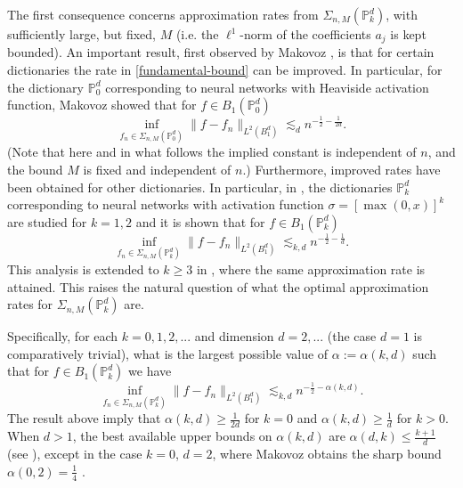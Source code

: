 The first consequence concerns approximation rates from $\Sigma_{n,M}(\mathbb{P}^d_k)$, with sufficiently large, but fixed, $M$ (i.e. the $\ell^1$-norm of the coefficients $a_j$ is kept bounded). An important result, first observed by Makovoz \cite{makovoz1996random}, is that for certain dictionaries the rate in \eqref{fundamental-bound} can be improved. In particular, for the dictionary $\mathbb{P}^d_0$ corresponding to neural networks with Heaviside activation function, Makovoz showed that for $f\in B_1(\mathbb{P}^d_0)$
\begin{equation}\label{makovoz-original}
 \inf_{f_n\in \Sigma_{n,M}(\mathbb{P}^d_0)} \|f - f_n\|_{L^2(B_1^d)} \lesssim_d n^{-\frac{1}{2}-\frac{1}{2d}}.
\end{equation}
(Note that here and in what follows the implied constant is independent of $n$, and the bound $M$ is fixed and independent of $n$.)
Furthermore, improved rates have been obtained for other dictionaries. In particular, in \cite{klusowski2018approximation}, the dictionaries $\mathbb{P}^d_k$ corresponding to neural networks with activation function $\sigma = [\max(0,x)]^k$ are studied for $k=1,2$ and it is shown that for $f\in B_1(\mathbb{P}^d_k)$
\begin{equation}
 \inf_{f_n\in \Sigma_{n,M}(\mathbb{P}^d_k)} \|f - f_n\|_{L^2(B_1^d)} \lesssim_{k,d} n^{-\frac{1}{2}-\frac{1}{d}}.
\end{equation}
This analysis is extended to $k\geq 3$ in \cite{CiCP-28-1707}, where the same approximation rate is attained. This raises the natural question of what the optimal approximation rates for $\Sigma_{n,M}(\mathbb{P}^d_k)$ are. 

Specifically, for each $k=0,1,2,...$ and dimension $d=2,...$ (the case $d=1$ is comparatively trivial), what is the largest possible value of $\alpha := \alpha(k,d)$ such that for $f\in B_1(\mathbb{P}^d_k)$ we have
\begin{equation}
 \inf_{f_n\in \Sigma_{n,M}(\mathbb{P}^d_k)} \|f - f_n\|_{L^2(B_1^d)} \lesssim_{k,d} n^{-\frac{1}{2}-\alpha(k,d)}.
\end{equation}
The result above imply that $\alpha(k,d) \geq \frac{1}{2d}$ for $k=0$ and $\alpha(k,d) \geq \frac{1}{d}$ for $k > 0$. When $d > 1$, the best available upper bounds on $\alpha(k,d)$ are $\alpha(d,k) \leq \frac{k+1}{d}$ (see \cite{makovoz1996random,klusowski2018approximation}), except in the case $k=0$, $d=2$, where Makovoz obtains the sharp bound $\alpha(0,2) = \frac{1}{4}$ \cite{makovoz1996random}.

